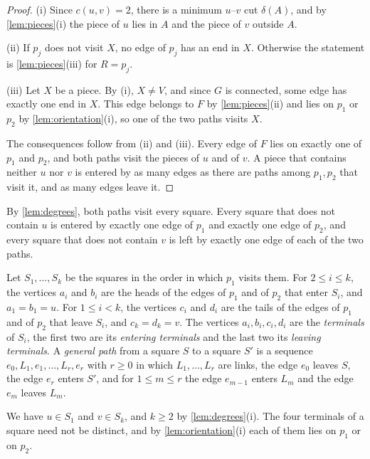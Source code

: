 \begin{proof}
(i) Since $c(u, v) = 2$, there is a minimum $u$--$v$ cut $\delta(A)$, and by \cref{lem:pieces}(i) the piece of $u$ lies in $A$ and the piece of $v$ outside $A$.

(ii) If $p_j$ does not visit $X$, no edge of $p_j$ has an end in $X$.
Otherwise the statement is \cref{lem:pieces}(iii) for $R = p_j$.

(iii) Let $X$ be a piece.
By (i), $X \neq V$, and since $G$ is connected, some edge has exactly one end in $X$.
This edge belongs to $F$ by \cref{lem:pieces}(ii) and lies on $p_1$ or $p_2$ by \cref{lem:orientation}(i), so one of the two paths visits $X$.

The consequences follow from (ii) and (iii).
Every edge of $F$ lies on exactly one of $p_1$ and $p_2$, and both paths visit the pieces of $u$ and of $v$.
A piece that contains neither $u$ nor $v$ is entered by as many edges as there are paths among $p_1, p_2$ that visit it, and as many edges leave it.
\end{proof}

By \cref{lem:degrees}, both paths visit every square.
Every square that does not contain $u$ is entered by exactly one edge of $p_1$ and exactly one edge of $p_2$, and every square that does not contain $v$ is left by exactly one edge of each of the two paths.

\begin{definition}
\label{def:decomposition}
Let $S_1, \dots, S_k$ be the squares in the order in which $p_1$ visits them.
For $2 \leq i \leq k$, the vertices $a_i$ and $b_i$ are the heads of the edges of $p_1$ and of $p_2$ that enter $S_i$, and $a_1 = b_1 = u$.
For $1 \leq i < k$, the vertices $c_i$ and $d_i$ are the tails of the edges of $p_1$ and of $p_2$ that leave $S_i$, and $c_k = d_k = v$.
The vertices $a_i, b_i, c_i, d_i$ are the \emph{terminals} of $S_i$, the first two are its \emph{entering terminals} and the last two its \emph{leaving terminals}.
A \emph{general path} from a square $S$ to a square $S'$ is a sequence $e_0, L_1, e_1, \dots, L_r, e_r$ with $r \geq 0$ in which $L_1, \dots, L_r$ are links, the edge $e_0$ leaves $S$, the edge $e_r$ enters $S'$, and for $1 \leq m \leq r$ the edge $e_{m-1}$ enters $L_m$ and the edge $e_m$ leaves $L_m$.
\end{definition}

We have $u \in S_1$ and $v \in S_k$, and $k \geq 2$ by \cref{lem:degrees}(i).
The four terminals of a square need not be distinct, and by \cref{lem:orientation}(i) each of them lies on $p_1$ or on $p_2$.

